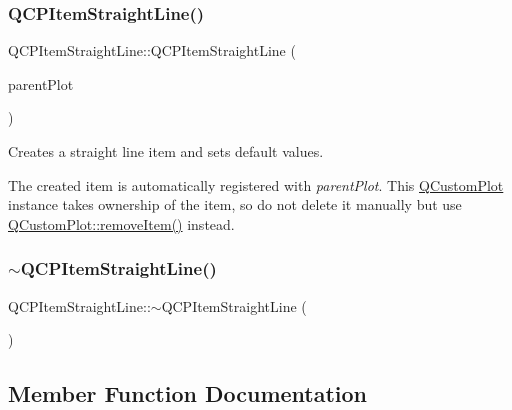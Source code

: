 \subsubsection{\texorpdfstring{QCPItemStraightLine()}{QCPItemStraightLine()}}
{\footnotesize\ttfamily Q\+C\+P\+Item\+Straight\+Line\+::\+Q\+C\+P\+Item\+Straight\+Line (\begin{DoxyParamCaption}\item[{\mbox{\hyperlink{class_q_custom_plot}{Q\+Custom\+Plot}} $\ast$}]{parent\+Plot }\end{DoxyParamCaption})\hspace{0.3cm}{\ttfamily [explicit]}}

Creates a straight line item and sets default values.

The created item is automatically registered with {\itshape parent\+Plot}. This \mbox{\hyperlink{class_q_custom_plot}{Q\+Custom\+Plot}} instance takes ownership of the item, so do not delete it manually but use \mbox{\hyperlink{class_q_custom_plot_ae04446557292551e8fb6e2c106e1848d}{Q\+Custom\+Plot\+::remove\+Item()}} instead. \mbox{\label{class_q_c_p_item_straight_line_a1f0730759916ce203baeaad1ad2af3ea}} 
\subsubsection{\texorpdfstring{$\sim$QCPItemStraightLine()}{~QCPItemStraightLine()}}
{\footnotesize\ttfamily Q\+C\+P\+Item\+Straight\+Line\+::$\sim$\+Q\+C\+P\+Item\+Straight\+Line (\begin{DoxyParamCaption}{ }\end{DoxyParamCaption})\hspace{0.3cm}{\ttfamily [virtual]}}



\subsection{Member Function Documentation}
\mbox{\label{class_q_c_p_item_straight_line_acbc84ad219bf4845152e4e2202fcaa3c}} 
